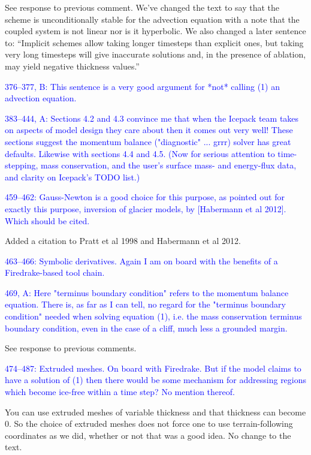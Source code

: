 \documentclass{article}
\theoremstyle{definition}
\theoremstyle{plain}
\begin{document}
See response to previous comment.
We've changed the text to say that the scheme is unconditionally stable for the advection equation with a note that the coupled system is not linear nor is it hyperbolic.
We also changed a later sentence to: ``Implicit schemes allow taking longer timesteps than explicit ones, but taking very long timesteps will give inaccurate solutions and, in the presence of ablation, may yield negative thickness values.''

\textcolor{blue}{376--377, B:  This sentence is a very good argument for *not* calling (1) an advection equation.}

\textcolor{blue}{383--444, A:  Sections 4.2 and 4.3 convince me that when the Icepack team takes on aspects of model design they care about then it comes out very well!  These sections suggest the momentum balance ("diagnostic" ... grrr) solver has great defaults.  Likewise with sections 4.4 and 4.5.  (Now for serious attention to time-stepping, mass conservation, and the user's surface mass- and energy-flux data, and clarity on Icepack's TODO list.)}

\textcolor{blue}{459--462:  Gauss-Newton is a good choice for this purpose, as pointed out for exactly this purpose, inversion of glacier models, by [Habermann et al 2012].  Which should be cited.}

Added a citation to Pratt et al 1998 and Habermann et al 2012.

\textcolor{blue}{463--466:  Symbolic derivatives.  Again I am on board with the benefits of a Firedrake-based tool chain.}

\textcolor{blue}{469, A:  Here "terminus boundary condition" refers to the momentum balance equation.  There is, as far as I can tell, no regard for the "terminus boundary condition" needed when solving equation (1), i.e. the mass conservation terminus boundary condition, even in the case of a cliff, much less a grounded margin.}

See response to previous comments.

\textcolor{blue}{474--487:  Extruded meshes.  On board with Firedrake.  But if the model claims to have a solution of (1) then there would be some mechanism for addressing regions which become ice-free within a time step?  No mention thereof.}

You can use extruded meshes of variable thickness and that thickness can become 0.
So the choice of extruded meshes does not force one to use terrain-following coordinates as we did, whether or not that was a good idea.
No change to the text.
\end{document}
